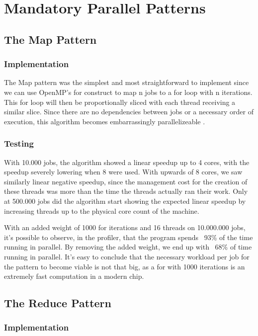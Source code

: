 \documentclass[9pt,journal]{IEEEtran}
\begin{document}
\section{Mandatory Parallel Patterns}
\subsection{The Map Pattern}
\label{map}

\subsubsection{Implementation}

The Map pattern was the simplest and most straightforward to implement since we can use OpenMP's for construct to map n jobs to a for loop with n iterations. This for loop will then be proportionally sliced with each thread receiving a similar slice. Since there are no dependencies between jobs or a necessary order of execution, this algorithm becomes embarrassingly parallelizeable \cite{mccool}.

\subsubsection{Testing}

With 10.000 jobs, the algorithm showed a linear speedup up to 4 cores, with the speedup severely lowering when 8 were used. With upwards of 8 cores, we saw similarly linear negative speedup, since the management cost for the creation of these threads was more than the time the threads actually ran their work. Only at 500.000 jobs did the algorithm start showing the expected linear speedup by increasing threads up to the physical core count of the machine.

With an added weight of 1000 for iterations and 16 threads on 10.000.000 jobs, it's possible to observe, in the profiler, that the program spends ~93\% of the time running in parallel. By removing the added weight, we end up with ~68\% of time running in parallel. It's easy to conclude that the necessary workload per job for the pattern to become viable is not that big, as a for with 1000 iterations is an extremely fast computation in a modern chip.

\subsection{The Reduce Pattern}
\label{reduce}

\subsubsection{Implementation}
\end{document}
